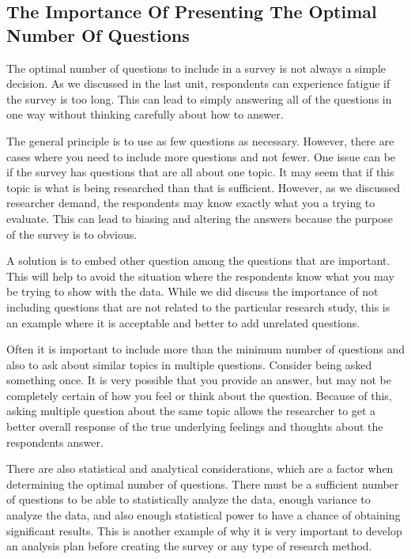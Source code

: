 \documentclass[]{book}
\theoremstyle{definition}
\theoremstyle{definition}
\theoremstyle{definition}
\theoremstyle{remark}
\begin{document}
\hypertarget{the-importance-of-presenting-the-optimal-number-of-questions}{%
\subsection{The Importance Of Presenting The Optimal Number Of
Questions}\label{the-importance-of-presenting-the-optimal-number-of-questions}}

The optimal number of questions to include in a survey is not always a
simple decision. As we discussed in the last unit, respondents can
experience fatigue if the survey is too long. This can lead to simply
answering all of the questions in one way without thinking carefully
about how to answer.

The general principle is to use as few questions as necessary. However,
there are cases where you need to include more questions and not fewer.
One issue can be if the survey has questions that are all about one
topic. It may seem that if this topic is what is being researched than
that is sufficient. However, as we discussed researcher demand, the
respondents may know exactly what you a trying to evaluate. This can
lead to biasing and altering the answers because the purpose of the
survey is to obvious.

A solution is to embed other question among the questions that are
important. This will help to avoid the situation where the respondents
know what you may be trying to show with the data. While we did discuss
the importance of not including questions that are not related to the
particular research study, this is an example where it is acceptable and
better to add unrelated questions.

Often it is important to include more than the minimum number of
questions and also to ask about similar topics in multiple questions.
Consider being asked something once. It is very possible that you
provide an answer, but may not be completely certain of how you feel or
think about the question. Because of this, asking multiple question
about the same topic allows the researcher to get a better overall
response of the true underlying feelings and thoughts about the
respondents answer.

There are also statistical and analytical considerations, which are a
factor when determining the optimal number of questions. There must be a
sufficient number of questions to be able to statistically analyze the
data, enough variance to analyze the data, and also enough statistical
power to have a chance of obtaining significant results. This is another
example of why it is very important to develop an analysis plan before
creating the survey or any type of research method.
\end{document}
